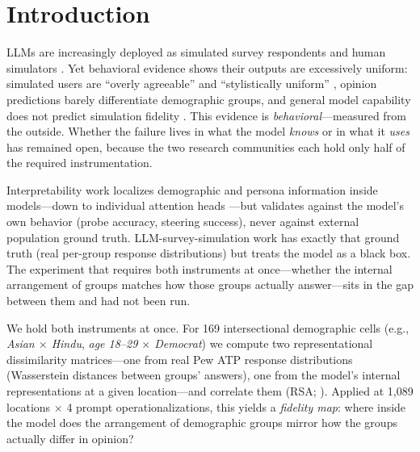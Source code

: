 \section{Introduction}
\label{sec:intro}

LLMs are increasingly deployed as simulated survey respondents and human
simulators \citep{subpop2025,odyssim2026}. Yet behavioral evidence shows
their outputs are excessively uniform: simulated users are ``overly
agreeable'' and ``stylistically uniform'' \citep{sim2real2026}, opinion
predictions barely differentiate demographic groups, and general model
capability does not predict simulation fidelity \citep{sim2real2026}. This
evidence is \emph{behavioral}---measured from the outside. Whether the
failure lives in what the model \emph{knows} or in what it \emph{uses} has
remained open, because the two research communities each hold only half
of the required instrumentation.

Interpretability work localizes demographic and persona information inside
models---down to individual attention heads \citep{llmopinions2026,
kimevans2025}---but validates against the model's own behavior (probe
accuracy, steering success), never against external population ground
truth. LLM-survey-simulation work has exactly that ground truth (real
per-group response distributions) but treats the model as a black box.
The experiment that requires both instruments at once---whether the
internal arrangement of groups matches how those groups actually
answer---sits in the gap between them and had not been run.

We hold both instruments at once. For 169 intersectional demographic
cells (e.g., \textit{Asian $\times$ Hindu}, \textit{age 18--29 $\times$
Democrat}) we compute two representational dissimilarity matrices---one
from real Pew ATP response distributions (Wasserstein distances between
groups' answers), one from the model's internal representations at a
given location---and correlate them (RSA; \citealp{kriegeskorte2008}).
Applied at 1{,}089 locations $\times$ 4 prompt operationalizations, this
yields a \emph{fidelity map}: where inside the model does the arrangement
of demographic groups mirror how the groups actually differ in opinion?

